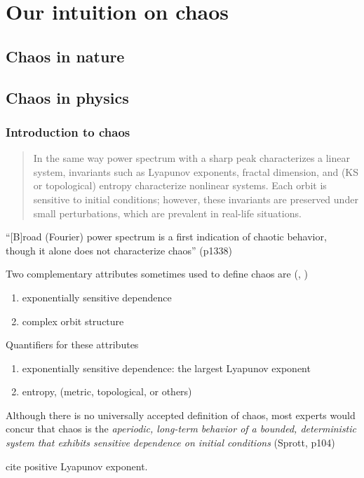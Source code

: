 \documentclass[11pt]{book}
\begin{document}
\chapter{Our intuition on chaos}
\section{Chaos in nature}

\section{Chaos in physics}
\subsection{Introduction to chaos}
\begin{quote}
In the same way power spectrum with a sharp peak characterizes a linear system, invariants such as Lyapunov exponents, fractal dimension, and (KS or topological) entropy characterize nonlinear systems.
Each orbit is sensitive to initial conditions; however, these invariants are preserved under small perturbations, which are prevalent in real-life situations.
\end{quote}
``[B]road (Fourier) power spectrum is a first indication of chaotic behavior, though it alone does not characterize chaos'' (p1338)
\citep{abarbanel}

Two complementary attributes sometimes used to define chaos are (\cite[p.~379]{ott1994}, )
\begin{enumerate}
  \item exponentially sensitive dependence
  \item complex orbit structure
\end{enumerate}
Quantifiers for these attributes
\begin{enumerate}
  \item exponentially sensitive dependence: the largest Lyapunov exponent  
  \item entropy, (metric, topological, or others)
\end{enumerate}

Although there is no universally accepted definition of chaos, most experts would concur that chaos is the {\it aperiodic, long-term behavior of a bounded, deterministic system that exhibits sensitive dependence on initial conditions} (Sprott, p104)

\citet{kantz-schreiber} cite positive Lyapunov exponent.
\end{document}
